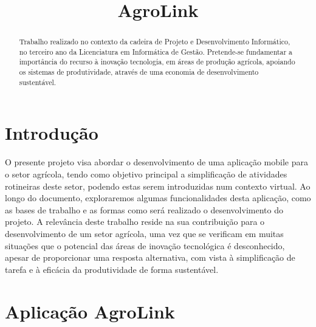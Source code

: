 \documentclass[conference]{IEEEtran}
\begin{document}
	
	\title{AgroLink}
	
	\author{
			
			\and
			\and
	}

	\maketitle
	
	\begin{abstract}
		Trabalho realizado no contexto da cadeira de Projeto e Desenvolvimento Informático, no
		terceiro ano da Licenciatura em Informática de Gestão. Pretende-se fundamentar a importância do recurso à inovação tecnologia, em áreas de produção agrícola, apoiando os sistemas de produtividade, através de uma economia de desenvolvimento sustentável.
	\end{abstract}
	
	
	\section{Introdução}
	O presente projeto visa abordar o desenvolvimento de uma aplicação mobile para o setor
	agrícola, tendo como objetivo principal a simplificação de atividades rotineiras deste setor,
	podendo estas serem introduzidas num contexto virtual. Ao longo do documento,
	exploraremos algumas funcionalidades desta aplicação, como as bases de trabalho e as formas
	como será realizado o desenvolvimento do projeto. A relevância deste trabalho reside na sua
	contribuição para o desenvolvimento de um setor agrícola, uma vez que se verificam em
	muitas situações que o potencial das áreas de inovação tecnológica é desconhecido, apesar de
	proporcionar uma resposta alternativa, com vista à simplificação de tarefa e à eficácia da
	produtividade de forma sustentável.
	
	\section{Aplicação AgroLink}
	
\end{document}
